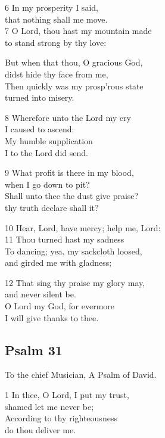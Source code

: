 6 In my prosperity I said,\\
that nothing shall me move.\\
7 O Lord, thou hast my mountain made\\
to stand strong by thy love:

But when that thou, O gracious God,\\
didst hide thy face from me,\\
Then quickly was my prosp’rous state\\
turned into misery.

8 Wherefore unto the Lord my cry\\
I caused to ascend:\\
My humble supplication\\
I to the Lord did send.

9 What profit is there in my blood,\\
when I go down to pit?\\
Shall unto thee the dust give praise?\\
thy truth declare shall it?

10 Hear, Lord, have mercy; help me, Lord:\\
11 Thou turned hast my sadness\\
To dancing; yea, my sackcloth loosed,\\
and girded me with gladness;

12 That sing thy praise my glory may,\\
and never silent be.\\
O Lord my God, for evermore\\
I will give thanks to thee.

\begin{center}
\quad{}\quad{}
\end{center}

\subsection*{Psalm 31 }

To the chief Musician, A Psalm of David.

1 In thee, O Lord, I put my trust,\\
shamed let me never be;\\
According to thy righteousness\\
do thou deliver me.

